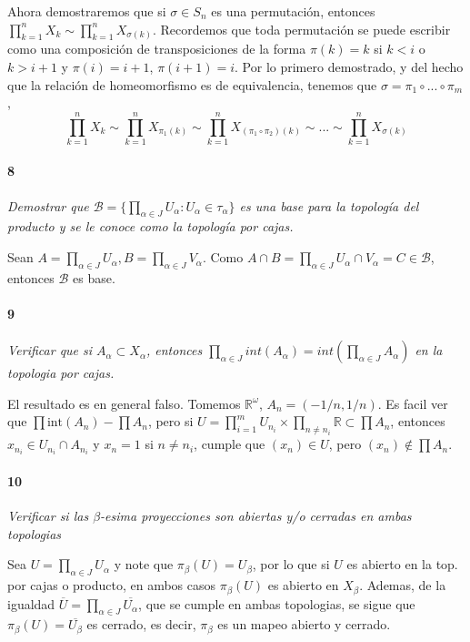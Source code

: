 \documentclass[12pt]{article}
\begin{document}
Ahora demostraremos que si $\sigma \in S_n$ es una permutación, entonces $\prod_{k=1}^{n} X_k \sim \prod_{k=1}^{n} X_{\sigma(k)}$.
Recordemos que toda permutación se puede escribir como una composición de transposiciones de la forma $\pi(k)=k$ si $k<i$ o $k>i+1$ y $\pi(i)=i+1$, $\pi(i+1)=i$. Por lo primero demostrado,
y del hecho que la relación de homeomorfismo es de equivalencia, tenemos que $\sigma=\pi_1 \circ ...\circ \pi_m$, $$\prod_{k=1}^{n} X_k \sim \prod_{k=1}^{n} X_{\pi_1(k)} \sim \prod_{k=1}^{n} X_{(\pi_1 \circ \pi_2)(k)} \sim ... \sim \prod_{k=1}^{n} X_{\sigma(k)}$$

\paragraph{8}
\textit{Demostrar que $\mathcal{B} = \{\prod\limits_{\alpha\in J}U_\alpha : U_\alpha\in\tau_\alpha\}$ es una base para la topología del producto y se le conoce como la topología por cajas.}

Sean $A=\prod_{\alpha \in J}U_\alpha, B=\prod_{\alpha \in J} V_\alpha$. Como $A \cap B=\prod_{\alpha \in J} U_\alpha \cap V_\alpha = C \in \mathcal{B}$, entonces $\mathcal{B}$ es base.

\paragraph{9}
\textit{Verificar que si $A_{\alpha}\subset X_{\alpha}$, entonces $\prod\limits_{\alpha\in J } int(A_{\alpha}) = int(\prod\limits_{\alpha\in J }A_{\alpha})$ en la topologia por cajas.}

El resultado es en general falso. Tomemos $\mathbb{R}^\omega$, $A_n=\left(-1/n,1/n\right)$. Es facil ver que $\prod \text{int}(A_n)-\prod A_n$, pero si $U=\prod_{i=1}^{m} U_{n_i} \times \prod_{n\neq n_i} \mathbb{R} \subset \prod A_n$,
entonces $x_{n_i} \in U_{n_i} \cap A_{n_i}$ y $x_n=1$ si $n \neq n_i$, cumple que $(x_n) \in U$, pero $(x_n) \notin \prod A_n$.
\paragraph{10}
\textit{Verificar si las $\beta$-esima proyecciones son abiertas y/o cerradas en ambas topologias}

Sea $U=\prod_{\alpha \in J} U_\alpha$ y note que $\pi_\beta(U)=U_\beta$, por lo que si $U$ es abierto en la top. por cajas o producto, en ambos casos $\pi_\beta(U)$ es abierto en $X_\beta$.
Ademas, de la igualdad $\overline{U}=\prod_{\alpha \in J} \overline{U_\alpha}$, que se cumple en ambas topologias, se sigue que $\pi_\beta(U)=\overline{U_\beta}$ es cerrado, es decir, $\pi_\beta$ es un mapeo abierto y cerrado.
\end{document}

